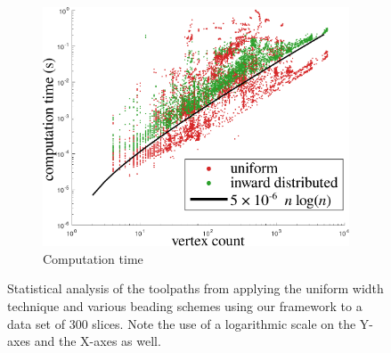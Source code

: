 \begin{figure}
\begin{subfigure}{\figwidth}\centering
\includegraphics[height=\figheight]{sources-validation-computime2.pdf}
\caption{Computation time}
\label{computime}
\end{subfigure}


\caption{
Statistical analysis of the toolpaths from applying the uniform width technique and various beading schemes using our framework to a data set of 300 slices.
Note the use of a logarithmic scale on the Y-axes and  the X-axes as well.
}
\label{statisticsfig}
\end{figure}







